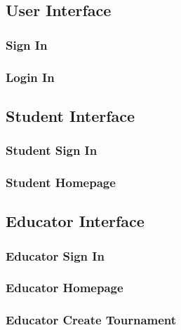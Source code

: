 \subsection{User Interface}
\subsubsection{Sign In}
\subsubsection{Login In}

\subsection{Student Interface}
\subsubsection{Student Sign In}
\subsubsection{Student Homepage}

\subsection{Educator Interface}
\subsubsection{Educator Sign In}
\subsubsection{Educator Homepage}
\subsubsection{Educator Create Tournament}